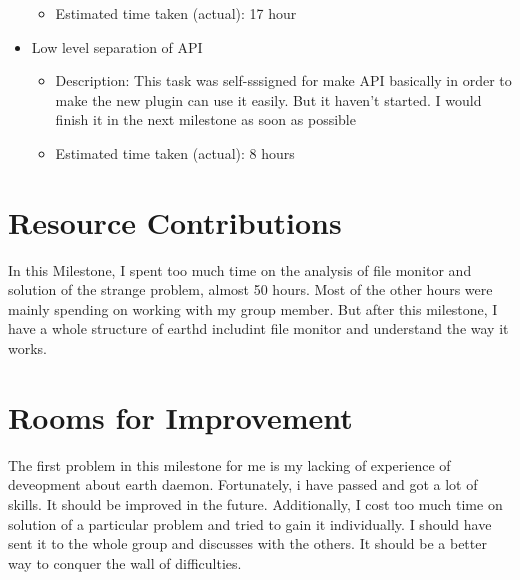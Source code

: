 \documentclass{article}
\begin{document}
\begin{itemize}
\begin{itemize}
	         \item Estimated time taken (actual): 17 hour
	     \end{itemize}
	\item Low level separation of API
	     \begin{itemize}
	         \item Description: This task was self-sssigned for make API basically in order to make the new plugin can use it easily. But it haven't started. I would finish it in the next milestone as soon as possible
	         \item Estimated time taken (actual): 8 hours
	     \end{itemize}
\end{itemize}

\section*{Resource Contributions}

In this Milestone, I spent too much time on the analysis of file monitor and solution of the strange problem, almost 50 hours. Most of the other hours were mainly spending on working with my group member. But after this milestone, I have a whole structure of earthd includint file monitor and understand the way it works.

\section*{Rooms for Improvement}


The first problem in this milestone for me is my lacking of experience of deveopment about earth daemon. Fortunately, i have passed and got a lot of skills. It should be improved in the future. Additionally, I cost too much time on solution of a particular problem and tried to gain it individually. I should have sent it to the whole group and discusses with the others. It should be a better way to conquer the wall of difficulties.
\end{document}
